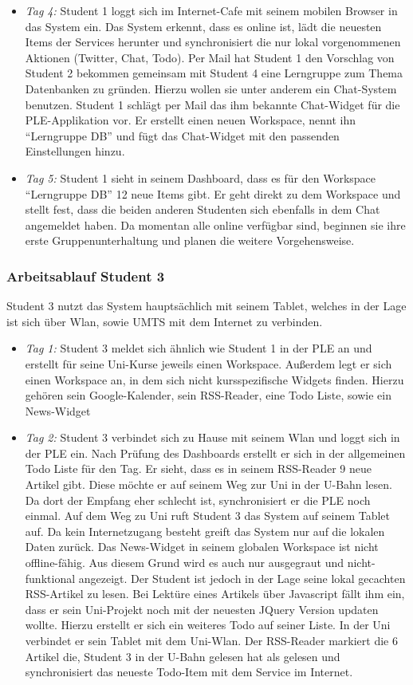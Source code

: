 \begin{itemize}
 \item \emph{Tag 4:} Student 1 loggt sich im Internet-Cafe mit seinem mobilen Browser in das System ein. Das System erkennt, dass es online ist, lädt die neuesten Items der Services herunter und synchronisiert die nur lokal vorgenommenen Aktionen (Twitter, Chat, Todo). Per Mail hat Student 1 den Vorschlag von Student 2 bekommen gemeinsam mit Student 4 eine Lerngruppe zum Thema Datenbanken zu gründen. Hierzu wollen sie unter anderem ein Chat-System benutzen. Student 1 schlägt per Mail das ihm bekannte Chat-Widget für die PLE-Applikation vor. Er erstellt einen neuen Workspace, nennt ihn “Lerngruppe DB” und fügt das Chat-Widget mit den passenden Einstellungen hinzu.
 \item \emph{Tag 5:} Student 1 sieht in seinem Dashboard, dass es für den Workspace “Lerngruppe DB” 12 neue Items gibt. Er geht direkt zu dem Workspace und stellt fest, dass die beiden anderen Studenten sich ebenfalls in dem Chat angemeldet haben. Da momentan alle online verfügbar sind, beginnen sie ihre erste Gruppenunterhaltung und planen die weitere Vorgehensweise.
\end{itemize}

\subsubsection{Arbeitsablauf Student 3}
Student 3 nutzt das System hauptsächlich mit seinem Tablet, welches in der Lage ist sich über Wlan, sowie UMTS mit dem Internet zu verbinden.

\begin{itemize}
 \item \emph{Tag 1:} Student 3 meldet sich ähnlich wie Student 1 in der PLE an und erstellt für seine Uni-Kurse jeweils einen Workspace. Außerdem legt er sich einen Workspace an, in dem sich nicht kursspezifische Widgets finden. Hierzu gehören sein Google-Kalender, sein RSS-Reader, eine Todo Liste, sowie ein News-Widget
 \item \emph{Tag 2:} Student 3 verbindet sich zu Hause mit seinem Wlan und loggt sich in der PLE ein. Nach Prüfung des Dashboards erstellt er sich in der allgemeinen Todo Liste für den Tag. Er sieht, dass es in seinem RSS-Reader 9 neue Artikel gibt. Diese möchte er auf seinem Weg zur Uni in der U-Bahn lesen. Da dort der Empfang eher schlecht ist, synchronisiert er die PLE noch einmal. Auf dem Weg zu Uni ruft Student 3 das System auf seinem Tablet auf. Da kein Internetzugang besteht greift das System nur auf die lokalen Daten zurück. Das News-Widget in seinem globalen Workspace ist nicht offline-fähig. Aus diesem Grund wird es auch nur ausgegraut und nicht-funktional angezeigt. Der Student ist jedoch in der Lage seine lokal gecachten RSS-Artikel zu lesen. Bei Lektüre eines Artikels über Javascript fällt ihm ein, dass er sein Uni-Projekt noch mit der neuesten JQuery Version updaten wollte. Hierzu erstellt er sich ein weiteres Todo auf seiner Liste.
 In der Uni verbindet er sein Tablet mit dem Uni-Wlan. Der RSS-Reader markiert die 6 Artikel die, Student 3 in der U-Bahn gelesen hat als gelesen und synchronisiert das neueste Todo-Item mit dem Service im Internet.  
\end{itemize}

